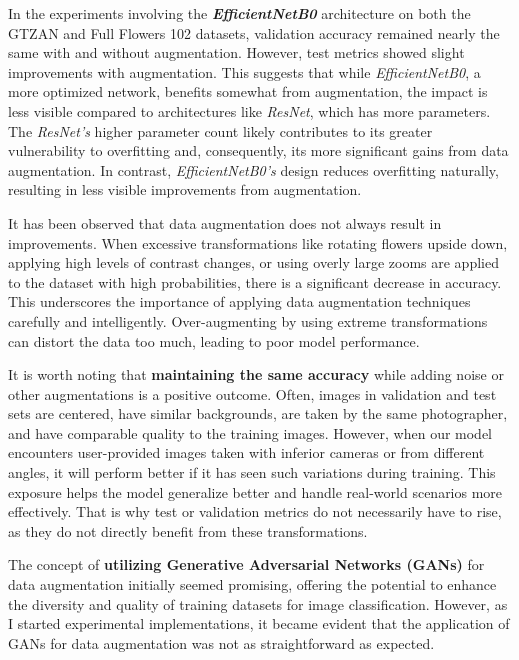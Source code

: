 In the experiments involving the \textbf{\textit{EfficientNetB0}} architecture on both the GTZAN and Full Flowers 102 datasets, validation accuracy remained nearly the same with and without augmentation. However, test metrics showed slight improvements with augmentation. This suggests that while \textit{EfficientNetB0}, a more optimized network, benefits somewhat from augmentation, the impact is less visible compared to architectures like \textit{ResNet}, which has more parameters. The \textit{ResNet's} higher parameter count likely contributes to its greater vulnerability to overfitting and, consequently, its more significant gains from data augmentation. In contrast, \textit{EfficientNetB0's} design reduces overfitting naturally, resulting in less visible improvements from augmentation.

It has been observed that data augmentation does not always result in improvements. When excessive transformations like rotating flowers upside down, applying high levels of contrast changes, or using overly large zooms are applied to the dataset with high probabilities, there is a significant decrease in accuracy. This underscores the importance of applying data augmentation techniques carefully and intelligently. Over-augmenting by using extreme transformations can distort the data too much, leading to poor model performance. 


It is worth noting that \textbf{maintaining the same accuracy} while adding noise or other augmentations is a positive outcome. Often, images in validation and test sets are centered, have similar backgrounds, are taken by the same photographer, and have comparable quality to the training images. However, when our model encounters user-provided images taken with inferior cameras or from different angles, it will perform better if it has seen such variations during training. This exposure helps the model generalize better and handle real-world scenarios more effectively. That is why test or validation metrics do not necessarily have to rise, as they do not directly benefit from these transformations.

The concept of \textbf{utilizing Generative Adversarial Networks (GANs)} for data augmentation initially seemed promising, offering the potential to enhance the diversity and quality of training datasets for image classification. However, as I started experimental implementations, it became evident that the application of GANs for data augmentation was not as straightforward as expected.

